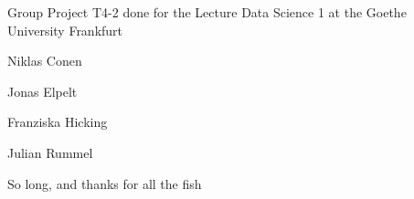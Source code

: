\label{index_md__home_nordegraf_Uni_8__Semester_Data_Science_I_datascience1_group42_README}%
%
Group Project T4-\/2 done for the Lecture Data Science 1 at the Goethe University Frankfurt
\begin{DoxyItemize}
\item Niklas Conen
\item Jonas Elpelt
\item Franziska Hicking
\item Julian Rummel
\end{DoxyItemize}

So long, and thanks for all the fish 